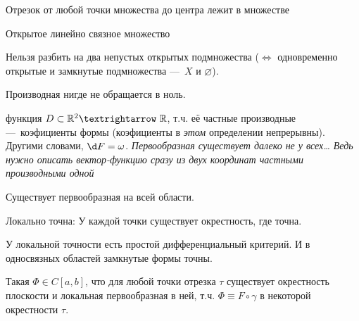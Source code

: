 \documentclass[12pt, a4paper, oneside]{memoir}
\begin{document}
\begin{definition}
    Отрезок от любой точки множества до центра лежит в множестве
\end{definition}

\begin{definition}[Область]
    Открытое линейно связное множество
\end{definition}

\begin{definition}
    
    Нельзя разбить на два непустых открытых подмножества
    ($\Leftrightarrow$ одновременно открытые и замкнутые подмножества — $X$ и $\varnothing$).
\end{definition}

\begin{definition}
    
    Производная нигде не обращается в ноль.
\end{definition}


\begin{definition}
    функция $D \subset \sR^2 → \sR$, 
    т.ч. её частные производные — коэфициенты формы (коэфициенты в \textit{этом} определении непрерывны).
    Другими словами, $\d F = \omega$. \textit{Первообразная существует далеко не у всех… Ведь нужно описать вектор-функцию сразу из двух координат частными производными одной}
\end{definition}

\begin{definition}
    Существует первообразная на всей области.
\end{definition}

\begin{definition}
    Локально точна: У каждой точки существует окрестность, где точна.
\end{definition}

У локальной точности есть простой дифференциальный критерий.
И в односвязных областей замкнутые формы точны.

\begin{definition}

    Такая $\Phi \in C[a, b]$, что для любой точки отрезка $\tau$ 
    существует окрестность плоскости и локальная первообразная в ней, 
    т.ч. $\Phi \equiv F \circ \gamma$ в некоторой окрестности $\tau$.
\end{definition}
\end{document}
